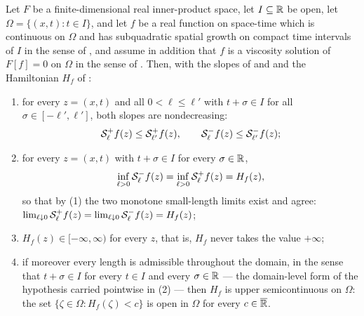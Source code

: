 \begin{lemma}
Let $F$ be a finite-dimensional real inner-product space, let $I\subseteq\mathbb{R}$ be
open, let $\Omega=\{(x,t):t\in I\}$, and let $f$ be a real function on space-time
which is continuous on $\Omega$ and has subquadratic spatial growth on compact
time intervals of $I$ in the sense of ,
and assume in addition that $f$ is a viscosity solution of $F[f]=0$ on $\Omega$ in the sense
of . Then, with the slopes of  and
 and the Hamiltonian $H_f$ of :
\begin{enumerate}
\item for every $z=(x,t)$ and all $0<\ell\le\ell'$ with $t+\sigma\in I$ for all
$\sigma\in[-\ell',\ell']$, both slopes are nondecreasing:
\[
  \mathcal{S}_\ell^+f(z)\le\mathcal{S}_{\ell'}^+f(z),\qquad
  \mathcal{S}_\ell^-f(z)\le\mathcal{S}_{\ell'}^-f(z);
\]
\item for every $z=(x,t)$ with $t+\sigma\in I$ for every $\sigma\in\mathbb{R}$,
\begin{equation}\label{eq:hamiltonian}
  \inf_{\ell>0}\mathcal{S}_\ell^-f(z)=\inf_{\ell>0}\mathcal{S}_\ell^+f(z)=H_f(z),
\end{equation}
so that by (1) the two monotone small-length limits exist and agree:
$\lim_{\ell\downarrow0}\mathcal{S}_\ell^+f(z)=
 \lim_{\ell\downarrow0}\mathcal{S}_\ell^-f(z)=H_f(z)$;
\item $H_f(z)\in[-\infty,\infty)$ for every $z$, that is, $H_f$ never takes the
value $+\infty$;
\item if moreover every length is admissible throughout the domain, in the sense
that $t+\sigma\in I$ for every $t\in I$ and every $\sigma\in\mathbb{R}$ --- the
domain-level form of the hypothesis carried pointwise in (2) --- then $H_f$ is
upper semicontinuous on $\Omega$: the set $\{\zeta\in\Omega:H_f(\zeta)<c\}$ is
open in $\Omega$ for every $c\in\overline{\mathbb{R}}$.
\end{enumerate}
\end{lemma}

